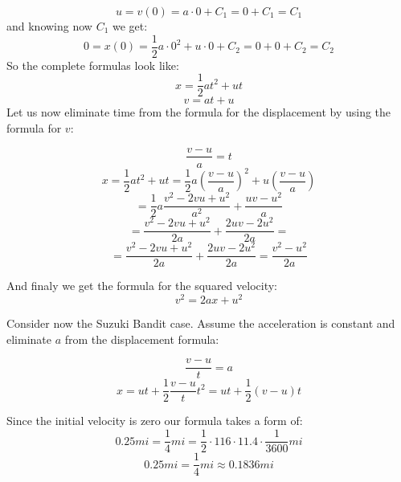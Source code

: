 \documentclass{article}
\begin{document}
\begin{equation*}
    u = v(0) = a \cdot 0 + C_{1} = 0 + C_{1} = C_{1}
\end{equation*}
and knowing now \(C_{1}\) we get:
\begin{equation*}
    0 = x(0) = \frac{1}{2}a \cdot 0^{2} + u \cdot 0 + C_{2} = 0 + 0 + C_{2} = C_{2}
\end{equation*}
So the complete formulas look like:
\begin{equation*}
   x = \frac{1}{2}at^{2} + ut
\end{equation*}
\begin{equation*}
   v = at + u
\end{equation*}
Let us now eliminate time from the formula for the displacement by using the formula for \(v\):

\begin{equation*}
    \frac{v - u}{a} = t
\end{equation*}
\begin{equation*}
    x = \frac{1}{2}at^{2} + ut = \frac{1}{2}a (\frac{v - u}{a})^{2} + u(\frac{v - u}{a})
\end{equation*}
\begin{equation*}
    = \frac{1}{2}a \frac{v^{2} - 2vu + u^{2}}{a^2} + \frac{uv - u^2}{a}
\end{equation*}
\begin{equation*}
    = \frac{v^{2} - 2vu + u^{2}}{2a} + \frac{2uv - 2u^2}{2a} = 
\end{equation*}
\begin{equation*}
    = \frac{v^{2} - 2vu + u^{2}}{2a} + \frac{2uv - 2u^2}{2a} = \frac{v^{2} - u^{2}}{2a}
\end{equation*}

And finaly we get the formula for the squared velocity:
\begin{equation*}
    v^2 = 2ax + u^{2}
\end{equation*}

Consider now the Suzuki Bandit case. Assume the acceleration is constant and eliminate
\(a\) from the displacement formula:

\begin{equation*}
    \frac{v - u}{t} = a
\end{equation*}
\begin{equation*}
    x = ut + \frac{1}{2}\frac{v - u}{t}t^{2} = ut + \frac{1}{2}(v - u)t
\end{equation*}

Since the initial velocity is zero our formula takes a form of:
\begin{equation*}
    0.25mi = \frac{1}{4}mi = \frac{1}{2} \cdot 116 \cdot 11.4 \cdot \frac{1}{3600} mi
\end{equation*}
\begin{equation*}
    0.25mi = \frac{1}{4}mi \approx 0.1836 mi
\end{equation*}
\end{document}
